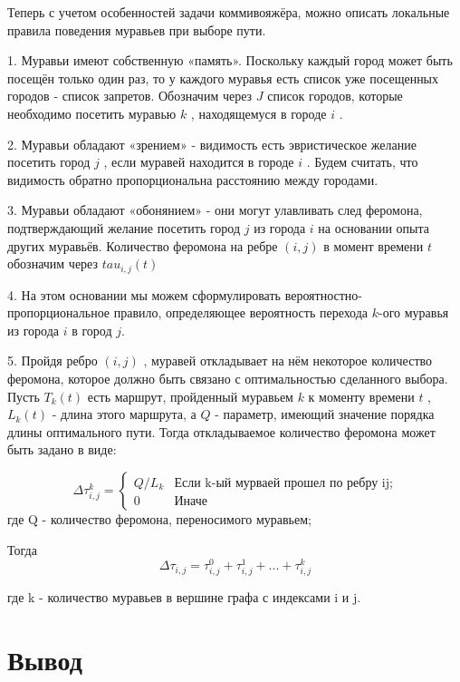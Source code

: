 \documentclass[12pt]{report}
\begin{document}
Теперь с учетом особенностей задачи коммивояжёра, можно описать локальные правила поведения муравьев при выборе пути.
		
	1. Муравьи имеют собственную «память». Поскольку каждый город может быть посещён только один раз, то у каждого муравья есть список уже посещенных городов - список запретов. Обозначим через $J$ список городов, которые необходимо посетить муравью $k$ , находящемуся в городе $i$ . 
	
	2. Муравьи обладают «зрением» - видимость есть эвристическое желание посетить город $j$ , если муравей находится в городе $i$ . Будем считать, что видимость обратно пропорциональна расстоянию между городами. 
	
	3. Муравьи обладают «обонянием» - они могут улавливать след феромона, подтверждающий желание посетить город $j$ из города $i$ на основании опыта других муравьёв. Количество феромона на ребре $(i,j)$ в момент времени $t$ обозначим через  $tau_{i,j} (t)$ 
	
	 4. На этом основании мы можем сформулировать вероятностно-пропорциональное правило, определяющее вероятность перехода $k$-ого муравья из города $i$  в город $j$. 
	 
	5. Пройдя ребро $(i,j)$ , муравей откладывает на нём некоторое количество феромона, которое должно быть связано с оптимальностью сделанного выбора. Пусть $T _{k} (t)$ есть маршрут, пройденный муравьем $k$ к моменту времени $t$ , $L _{k} (t)$ - длина этого маршрута, а $Q$ - параметр, имеющий значение порядка длины оптимального пути. Тогда откладываемое количество феромона может быть задано в виде:
	
 \begin{equation}\label{form:add} 
    {\displaystyle \Delta \tau_{i,j}^k={\begin{cases}Q/L_{k}& {\mbox{Если k-ый мурваей прошел по ребру ij;}}\\0&{\mbox{Иначе}}\end{cases}}}
\end{equation}
   где \quad Q - количество феромона, переносимого муравьем;
   
 Тогда
 \begin{equation}\label{form:add1} 
    \Delta \tau_{i,j}= \tau_{i,j}^0 + \tau_{i,j}^1 + ... + \tau_{i,j}^k 
\end{equation}
   
    где k - количество муравьев в вершине графа с индексами i и j.



\section{Вывод}
\end{document}
